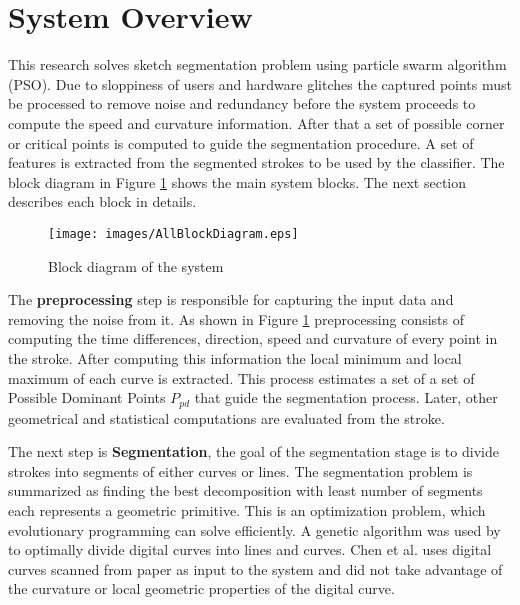 \section{System Overview}
\label{sec:AnOverviewOfTheSystem}
   This research solves sketch segmentation problem using particle swarm algorithm (PSO).  Due to sloppiness of users and hardware glitches the captured points must be processed to remove noise and redundancy before the system proceeds to compute the speed and curvature information. After that a set of possible corner or critical points is computed to guide the segmentation procedure.  A set of features is extracted from the segmented strokes to be used by the classifier.  %
The block diagram in Figure \ref{fig:Blockdiagram} shows the main system blocks. The next section describes each block in details.
\begin{figure}[]
	\centering
	
\begin{center}
	\texttt{[image: images/AllBlockDiagram.eps]}
	\caption[The System Block Diagram]{Block diagram of the system}
	\label{fig:Blockdiagram}
\end{center}
\end{figure}
 


The \textbf{preprocessing} step is responsible for capturing the input data and removing the noise from it. As shown in Figure \ref{fig:Blockdiagram} preprocessing consists of computing the time differences, direction, speed and curvature of every point in the stroke. After computing this information the local minimum and local maximum of each curve is extracted. This process estimates a set of a set of Possible Dominant Points $P_{pd}$ that guide the segmentation process. Later, other geometrical and statistical computations are evaluated from the stroke. %
 
  
The next step is \textbf{Segmentation}, the goal of the segmentation stage is to divide strokes into segments of either curves or lines. The segmentation problem is summarized as finding the best decomposition with least number of segments each represents a geometric primitive. This is an optimization problem, which evolutionary programming can solve efficiently. A genetic algorithm was used by \cite{CruveDivisionSwarm} to optimally divide digital curves into lines and curves. Chen et al.\cite{CruveDivisionSwarm} uses digital curves scanned from paper as input to the system and did not take advantage of the curvature or local geometric properties of the digital curve.

